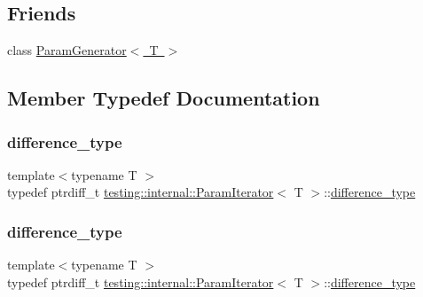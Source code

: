 \subsection*{Friends}
\begin{DoxyCompactItemize}
\item 
class \mbox{\hyperlink{classtesting_1_1internal_1_1_param_iterator_ab73a355ae191f2f7eab54b65ca557714}{Param\+Generator$<$ T $>$}}
\end{DoxyCompactItemize}


\subsection{Member Typedef Documentation}
\mbox{\label{classtesting_1_1internal_1_1_param_iterator_a6c37240a04ba3fc4c56f6c413cf4771d}} 
\subsubsection{\texorpdfstring{difference\_type}{difference\_type}\hspace{0.1cm}{\footnotesize\ttfamily [1/3]}}
{\footnotesize\ttfamily template$<$typename T $>$ \\
typedef ptrdiff\+\_\+t \mbox{\hyperlink{classtesting_1_1internal_1_1_param_iterator}{testing\+::internal\+::\+Param\+Iterator}}$<$ T $>$\+::\mbox{\hyperlink{classtesting_1_1internal_1_1_param_iterator_a6c37240a04ba3fc4c56f6c413cf4771d}{difference\+\_\+type}}}

\mbox{\label{classtesting_1_1internal_1_1_param_iterator_a6c37240a04ba3fc4c56f6c413cf4771d}} 
\subsubsection{\texorpdfstring{difference\_type}{difference\_type}\hspace{0.1cm}{\footnotesize\ttfamily [2/3]}}
{\footnotesize\ttfamily template$<$typename T $>$ \\
typedef ptrdiff\+\_\+t \mbox{\hyperlink{classtesting_1_1internal_1_1_param_iterator}{testing\+::internal\+::\+Param\+Iterator}}$<$ T $>$\+::\mbox{\hyperlink{classtesting_1_1internal_1_1_param_iterator_a6c37240a04ba3fc4c56f6c413cf4771d}{difference\+\_\+type}}}

